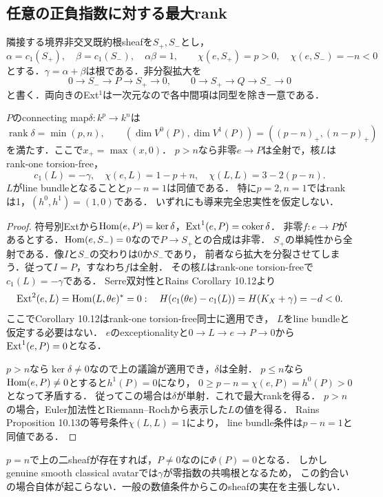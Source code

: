 \subsection{任意の正負指数に対する最大rank}
隣接する境界非交叉既約根sheafを$S_+,S_-$とし，
\[
\alpha=c_1(S_+),\quad\beta=c_1(S_-),\quad\alpha\beta=1,
\qquad\chi(e,S_+)=p>0,\quad\chi(e,S_-)=-n<0
\]
とする．$\gamma=\alpha+\beta$は根である．非分裂拡大を
\begin{equation}\label{eq:a2-two-extensions}
0\to S_-\to P\to S_+\to0,\qquad
0\to S_+\to Q\to S_-\to0
\end{equation}
と書く．両向きのExt$^1$は一次元なので各中間項は同型を除き一意である．

\begin{theorem}
\label{thm:a2-delta-rank}
$P$のconnecting map$\delta:k^p\to k^n$は
\[
\boxed{\operatorname{rank}\delta=\min(p,n),\qquad
 (\dim V^0(P),\dim V^1(P))=((p-n)_+,(n-p)_+)}
\]
を満たす．ここで$x_+=\max(x,0)$．
$p>n$なら非零$e\to P$は全射で，核$L$はrank-one torsion-free，
\[
c_1(L)=-\gamma,\quad\chi(e,L)=1-p+n,\quad
\chi(L,L)=3-2(p-n).
\]
$L$がline bundleとなることと$p-n=1$は同値である．
特に$p=2,n=1$ではrankは1，$(h^0,h^1)=(1,0)$である．
いずれにも導来完全忠実性を仮定しない．
\end{theorem}
\begin{proof}
符号別Extから$\operatorname{Hom}(e,P)=\ker\delta$，$\operatorname{Ext}^1(e,P)=\operatorname{coker}\delta$．
非零$f:e\to P$があるとする．$\operatorname{Hom}(e,S_-)=0$なので$P\to S_+$との合成は非零．
$S_+$の単純性から全射である．像$I$と$S_-$の交わりは$0$か$S_-$であり，
前者なら拡大を分裂させてしまう．従って$I=P$，すなわち$f$は全射．
その核$L$はrank-one torsion-freeで$c_1(L)=-\gamma$である．
Serre双対性とRains Corollary 10.12より
\[
\operatorname{Ext}^2(e,L)=\operatorname{Hom}(L,\theta e)^*=0:
\quad H(c_1(\theta e)-c_1(L))=H(K_X+\gamma)=-d<0.
\]
ここでCorollary 10.12はrank-one torsion-free同士に適用でき，
$L$をline bundleと仮定する必要はない．
$e$のexceptionalityと$0\to L\to e\to P\to0$から$\operatorname{Ext}^1(e,P)=0$となる．

$p>n$なら$\ker\delta\ne0$なので上の議論が適用でき，$\delta$は全射．
$p\le n$なら$\operatorname{Hom}(e,P)\ne0$とすると$h^1(P)=0$になり，
$0\ge p-n=\chi(e,P)=h^0(P)>0$となって矛盾する．
従ってこの場合は$\delta$が単射．これで最大rankを得る．
$p>n$の場合，Euler加法性とRiemann--Rochから表示した$L$の値を得る．
Rains Proposition 10.13の等号条件$\chi(L,L)=1$により，
line bundle条件は$p-n=1$と同値である．
\end{proof}
\begin{remark}[指数の釣合いと消失]
$p=n$で上の二sheafが存在すれば，$P\ne0$なのに$\Phi(P)=0$となる．
しかしgenuine smooth classical avatarでは$\gamma$が零指数の共鳴根となるため，
この釣合いの場合自体が起こらない．一般の数値条件からこのsheafの実在を主張しない．
\end{remark}

